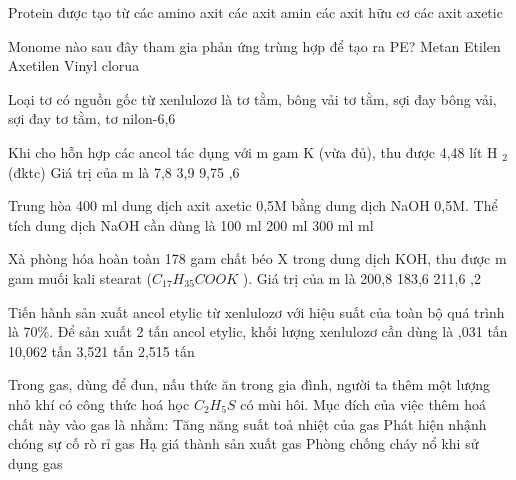 \begin{ex}
	Protein được tạo từ
	\choice
	{\True các amino axit}
	{các axit amin}
	{các axit hữu cơ}
	{các axit axetic}
\end{ex}
\begin{ex}
	Monome nào sau đây tham gia phản ứng trùng hợp để tạo ra PE?
	\choice
	{Metan}
	{\True Etilen}
	{Axetilen}
	{Vinyl clorua}
\end{ex}
\begin{ex}
	Loại tơ có nguồn gốc từ xenlulozơ là
	\choice
	{tơ tằm, bông vải}
	{tơ tằm, sợi đay}
	{\True bông vải, sợi đay}
	{tơ tằm, tơ nilon-6,6}
\end{ex}
\begin{ex}
	Khi cho hỗn hợp các ancol tác dụng với m gam K (vừa đủ), thu được 4,48 lít H $_2$ (đktc) Giá trị của m là
	\choice
	{7,8}
	{3,9}
	{9,75}
	{,6}
	\loigiai{}
\end{ex}
\begin{ex}
	Trung hòa 400 ml dung dịch axit axetic 0,5M bằng dung dịch NaOH 0,5M. Thể tích dung dịch NaOH cần dùng là
	\choice
	{100 ml}
	{200 ml}
	{300 ml}
	{ ml}
	\loigiai{}
\end{ex}
\begin{ex}Xà phòng hóa hoàn toàn 178 gam chất béo X trong dung dịch KOH, thu được m gam muối kali stearat ($C_{17}H_{35}COOK$ ). Giá trị của m là
	\choice
	{200,8}
	{183,6}
	{211,6}
	{,2}
	\loigiai{}
\end{ex}
\begin{ex}
	Tiến hành sản xuất ancol etylic từ xenlulozơ với hiệu suất của toàn bộ quá trình là 70\%. Để sản xuất 2 tấn ancol etylic, khối lượng xenlulozơ cần dùng là
	\choice
	{,031 tấn}
	{10,062 tấn}
	{3,521 tấn}
	{2,515 tấn}
	\loigiai{}
\end{ex}
\begin{ex}
	Trong gas, dùng để đun, nấu thức ăn trong gia đình, người ta thêm một lượng nhỏ khí có công thức hoá học  $C_2H_5S$  có mùi hôi. Mục đích của việc thêm hoá chất này vào gas là nhằm:
	\choice
	{Tăng năng suất toả nhiệt của gas}
	{\True Phát hiện nhậnh chóng sự cố rò rỉ gas}
	{Hạ giá thành sản xuất gas}
	{Phòng chống cháy nổ khi sử dụng gas}
	\loigiai{}
\end{ex}
